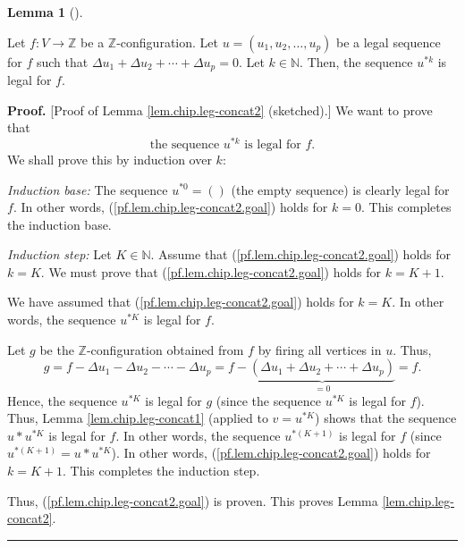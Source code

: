 \documentclass[numbers=enddot,12pt,final,onecolumn,notitlepage]{scrartcl}%
\theoremstyle{definition}
\newtheorem{lem}[theo]{Lemma}
\newenvironment{lemma}[1][]
{\begin{lem}[#1]\begin{leftbar}}
{\end{leftbar}\end{lem}}
\newenvironment{proof}[1][Proof]{\noindent\textbf{#1.} }{\ \rule{0.5em}{0.5em}}
\begin{document}
\begin{lemma}
\label{lem.chip.leg-concat2}Let $f:V\rightarrow\mathbb{Z}$ be a $\mathbb{Z}%
$-configuration. Let $u=\left(  u_{1},u_{2},\ldots,u_{p}\right)  $ be a legal
sequence for $f$ such that $\Delta u_{1}+\Delta u_{2}+\cdots+\Delta u_{p}=0$.
Let $k\in\mathbb{N}$. Then, the sequence $u^{\ast k}$ is legal for $f$.
\end{lemma}

\begin{proof}
[Proof of Lemma \ref{lem.chip.leg-concat2} (sketched).] We want to prove that%
\begin{equation}
\text{the sequence }u^{\ast k}\text{ is legal for }%
f.\label{pf.lem.chip.leg-concat2.goal}%
\end{equation}
We shall prove this by induction over $k$:

\textit{Induction base:} The sequence $u^{\ast0}=\left(  {}\right)  $ (the
empty sequence) is clearly legal for $f$. In other words,
(\ref{pf.lem.chip.leg-concat2.goal}) holds for $k=0$. This completes the
induction base.

\textit{Induction step:} Let $K\in\mathbb{N}$. Assume that
(\ref{pf.lem.chip.leg-concat2.goal}) holds for $k=K$. We must prove that
(\ref{pf.lem.chip.leg-concat2.goal}) holds for $k=K+1$.

We have assumed that (\ref{pf.lem.chip.leg-concat2.goal}) holds for $k=K$. In
other words, the sequence $u^{\ast K}$ is legal for $f$.

Let $g$ be the $\mathbb{Z}$-configuration obtained from $f$ by firing all
vertices in $u$. Thus,
\[
g=f-\Delta u_{1}-\Delta u_{2}-\cdots-\Delta u_{p}=f-\underbrace{\left(  \Delta
u_{1}+\Delta u_{2}+\cdots+\Delta u_{p}\right)  }_{=0}=f.
\]
Hence, the sequence $u^{\ast K}$ is legal for $g$ (since the sequence $u^{\ast
K}$ is legal for $f$). Thus, Lemma \ref{lem.chip.leg-concat1} (applied to
$v=u^{\ast K}$) shows that the sequence $u\ast u^{\ast K}$ is legal for $f$.
In other words, the sequence $u^{\ast\left(  K+1\right)  }$ is legal for $f$
(since $u^{\ast\left(  K+1\right)  }=u\ast u^{\ast K}$). In other words,
(\ref{pf.lem.chip.leg-concat2.goal}) holds for $k=K+1$. This completes the
induction step.

Thus, (\ref{pf.lem.chip.leg-concat2.goal}) is proven. This proves Lemma
\ref{lem.chip.leg-concat2}.
\end{proof}
\end{document}
